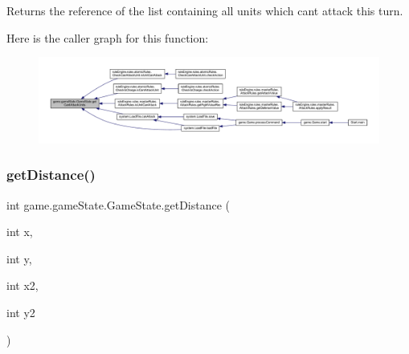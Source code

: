 \begin{DoxyReturn}{Returns}
the reference of the list containing all units which can\textquotesingle{}t attack this turn. 
\end{DoxyReturn}
Here is the caller graph for this function\+:
\nopagebreak
\begin{figure}[H]
\begin{center}
\leavevmode
\includegraphics[width=350pt]{classgame_1_1game_state_1_1_game_state_a79fab4d746df83e6391ecb9db1c3ff09_icgraph}
\end{center}
\end{figure}
\mbox{\label{classgame_1_1game_state_1_1_game_state_a29fa52bbdf644f5107e5d150107801a2}} 
\subsubsection{\texorpdfstring{get\+Distance()}{getDistance()}}
{\footnotesize\ttfamily int game.\+game\+State.\+Game\+State.\+get\+Distance (\begin{DoxyParamCaption}\item[{int}]{x,  }\item[{int}]{y,  }\item[{int}]{x2,  }\item[{int}]{y2 }\end{DoxyParamCaption})\hspace{0.3cm}{\ttfamily [inline]}}


